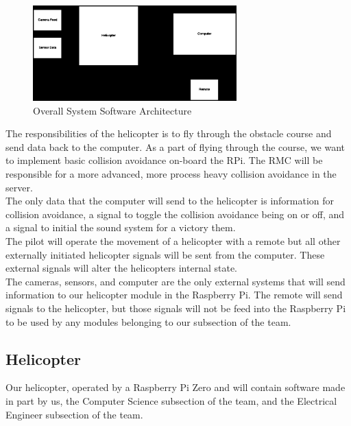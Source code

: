 \documentclass[onecolumn, oneside, letterpaper, draftclsnofoot, 10pt, compsoc]{IEEEtran}
\begin{document}
\begin{figure}[h]
    \centering
    \includegraphics[width=0.7\textwidth]{graphics/high_level_overall_arch.eps}
    \caption{Overall System Software Architecture}
    \label{fig:OverallSystemArchitecture}
\end{figure}

The responsibilities of the helicopter is to fly through the obstacle course and send data back to the computer. As a part of flying through the course, we want to implement basic collision avoidance on-board the RPi. The RMC will be responsible for a more advanced, more process heavy collision avoidance in the server. \\

The only data that the computer will send to the helicopter is information for collision avoidance, a signal to toggle the collision avoidance being on or off, and a signal to initial the sound system for a victory them. \\

The pilot will operate the movement of a helicopter with a remote but all other externally initiated helicopter signals will be sent from the computer. These external signals will alter the helicopter\textquotesingle s internal state. \\

The cameras, sensors, and computer are the only external systems that will send information to our helicopter module in the Raspberry Pi. The remote will send signals to the helicopter, but those signals will not be feed into the Raspberry Pi to be used by any modules belonging to our subsection of the team.

\subsection{Helicopter}
Our helicopter, operated by a Raspberry Pi Zero and will contain software made in part by us, the Computer Science subsection of the team, and the Electrical Engineer subsection of the team. \\
\end{document}
